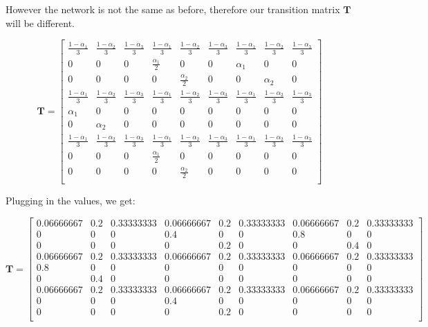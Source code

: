 \documentclass{article}
\begin{document}
However the network is not the same as before, therefore our transition matrix $\mathbf{T}$ will be different.

\[\mathbf{T}=
\begin{bmatrix}
    \frac{1-\alpha_1}{3} &  \frac{1-\alpha_2}{3} & \frac{1-\alpha_3}{3} & \frac{1-\alpha_1}{3} &  \frac{1-\alpha_2}{3} & \frac{1-\alpha_3}{3} & \frac{1-\alpha_1}{3} &  \frac{1-\alpha_2}{3} & \frac{1-\alpha_3}{3} \\
    0 & 0 & 0 &  \frac{\alpha_1}{2} & 0 & 0 & \alpha_1 & 0 & 0 \\
    0 & 0 & 0 & 0 & \frac{\alpha_2}{2} & 0 & 0 & \alpha_2 & 0 \\
        \frac{1-\alpha_1}{3} &  \frac{1-\alpha_2}{3} & \frac{1-\alpha_3}{3} & \frac{1-\alpha_1}{3} &  \frac{1-\alpha_2}{3} & \frac{1-\alpha_3}{3} & \frac{1-\alpha_1}{3} &  \frac{1-\alpha_2}{3} & \frac{1-\alpha_3}{3} \\
	    \alpha_1 & 0 & 0 & 0 & 0 & 0 & 0 & 0 & 0 \\
	   0 & \alpha_2 & 0 & 0 & 0 & 0 & 0 & 0 & 0 \\
        \frac{1-\alpha_1}{3} &  \frac{1-\alpha_2}{3} & \frac{1-\alpha_3}{3} & \frac{1-\alpha_1}{3} &  \frac{1-\alpha_2}{3} & \frac{1-\alpha_3}{3} & \frac{1-\alpha_1}{3} &  \frac{1-\alpha_2}{3} & \frac{1-\alpha_3}{3} \\
		  0 & 0 & 0 & \frac{\alpha_1}{2} & 0 & 0 & 0 & 0 & 0 \\
		  0 & 0 & 0 & 0 & \frac{\alpha_2}{2} & 0 & 0 & 0 & 0 \\

\end{bmatrix}
\]

Plugging in the values, we get:

\[\mathbf{T}=
\begin{bmatrix}
    0.06666667 & 0.2 & 0.33333333 &  0.06666667 &  0.2 & 0.33333333 & 0.06666667 & 0.2 & 0.33333333 \\
    0 & 0 & 0 & 0.4 & 0 & 0 & 0.8 & 0 & 0 \\
    0 & 0 & 0 & 0 & 0.2 & 0 & 0 & 0.4 & 0 \\
       0.06666667 & 0.2 & 0.33333333 &  0.06666667 &  0.2 & 0.33333333 & 0.06666667 & 0.2 & 0.33333333 \\
	   0.8 & 0 & 0 & 0 & 0 & 0 & 0 & 0 & 0 \\
	   0 & 0.4 & 0 & 0 & 0 & 0 & 0 & 0 & 0 \\
       0.06666667 & 0.2 & 0.33333333 &  0.06666667 &  0.2 & 0.33333333 & 0.06666667 & 0.2 & 0.33333333 \\
		  0 & 0 & 0 & 0.4 & 0 & 0 & 0 & 0 & 0 \\
		  0 & 0 & 0 & 0 &0.2 & 0 & 0 & 0 & 0 \\

\end{bmatrix}
\]
\end{document}
